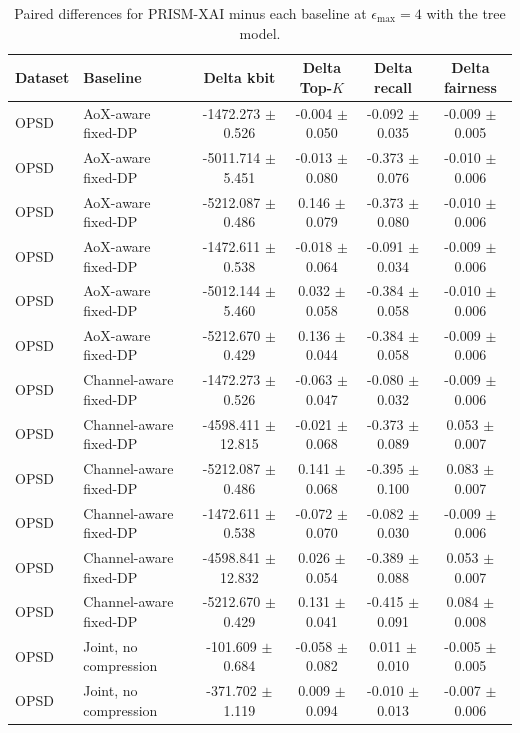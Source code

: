 \begin{table}[t]
\caption{Paired differences for PRISM-XAI minus each baseline at $\epsilon_{\max}=4$ with the tree model.}
\label{tab:paired-differences}
\centering
\scriptsize
\setlength{\tabcolsep}{3pt}
\begin{tabular}{llcccc}
\toprule
Dataset & Baseline & Delta kbit & Delta Top-$K$ & Delta recall & Delta fairness \\
\midrule
OPSD & AoX-aware fixed-DP & -1472.273 $\pm$ 0.526 & -0.004 $\pm$ 0.050 & -0.092 $\pm$ 0.035 & -0.009 $\pm$ 0.005 \\
OPSD & AoX-aware fixed-DP & -5011.714 $\pm$ 5.451 & -0.013 $\pm$ 0.080 & -0.373 $\pm$ 0.076 & -0.010 $\pm$ 0.006 \\
OPSD & AoX-aware fixed-DP & -5212.087 $\pm$ 0.486 & 0.146 $\pm$ 0.079 & -0.373 $\pm$ 0.080 & -0.010 $\pm$ 0.006 \\
OPSD & AoX-aware fixed-DP & -1472.611 $\pm$ 0.538 & -0.018 $\pm$ 0.064 & -0.091 $\pm$ 0.034 & -0.009 $\pm$ 0.006 \\
OPSD & AoX-aware fixed-DP & -5012.144 $\pm$ 5.460 & 0.032 $\pm$ 0.058 & -0.384 $\pm$ 0.058 & -0.010 $\pm$ 0.006 \\
OPSD & AoX-aware fixed-DP & -5212.670 $\pm$ 0.429 & 0.136 $\pm$ 0.044 & -0.384 $\pm$ 0.058 & -0.009 $\pm$ 0.006 \\
OPSD & Channel-aware fixed-DP & -1472.273 $\pm$ 0.526 & -0.063 $\pm$ 0.047 & -0.080 $\pm$ 0.032 & -0.009 $\pm$ 0.006 \\
OPSD & Channel-aware fixed-DP & -4598.411 $\pm$ 12.815 & -0.021 $\pm$ 0.068 & -0.373 $\pm$ 0.089 & 0.053 $\pm$ 0.007 \\
OPSD & Channel-aware fixed-DP & -5212.087 $\pm$ 0.486 & 0.141 $\pm$ 0.068 & -0.395 $\pm$ 0.100 & 0.083 $\pm$ 0.007 \\
OPSD & Channel-aware fixed-DP & -1472.611 $\pm$ 0.538 & -0.072 $\pm$ 0.070 & -0.082 $\pm$ 0.030 & -0.009 $\pm$ 0.006 \\
OPSD & Channel-aware fixed-DP & -4598.841 $\pm$ 12.832 & 0.026 $\pm$ 0.054 & -0.389 $\pm$ 0.088 & 0.053 $\pm$ 0.007 \\
OPSD & Channel-aware fixed-DP & -5212.670 $\pm$ 0.429 & 0.131 $\pm$ 0.041 & -0.415 $\pm$ 0.091 & 0.084 $\pm$ 0.008 \\
OPSD & Joint, no compression & -101.609 $\pm$ 0.684 & -0.058 $\pm$ 0.082 & 0.011 $\pm$ 0.010 & -0.005 $\pm$ 0.005 \\
OPSD & Joint, no compression & -371.702 $\pm$ 1.119 & 0.009 $\pm$ 0.094 & -0.010 $\pm$ 0.013 & -0.007 $\pm$ 0.006 \\

\end{tabular}
\end{table}
